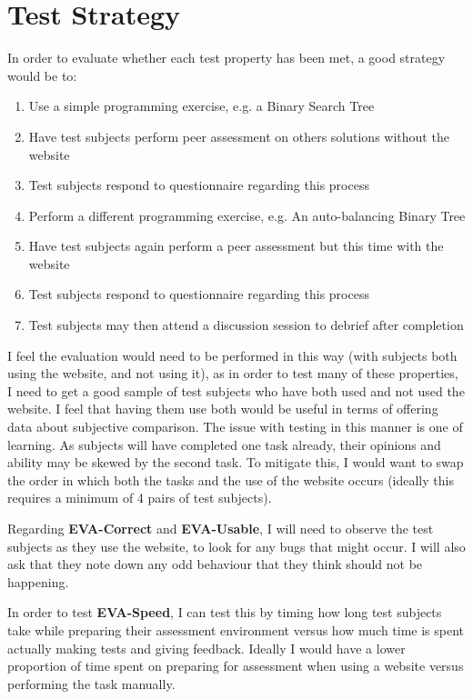 \documentclass[a4paper,11pt]{report}
\begin{document}
\section{Test Strategy}
In order to evaluate whether each test property has been met, a good strategy would be to:
\begin{enumerate}
 \item Use a simple programming exercise, e.g. a Binary Search Tree
 \item Have test subjects perform peer assessment on others solutions without the website
 \item Test subjects respond to questionnaire regarding this process
 \item Perform a different programming exercise, e.g. An auto-balancing Binary Tree
 \item Have test subjects again perform a peer assessment but this time with the website
 \item Test subjects respond to questionnaire regarding this process
 \item Test subjects may then attend a discussion session to debrief after completion
\end{enumerate}
I feel the evaluation would need to be performed in this way (with subjects both using the website, and not using it), as in order to test many of these properties, I need to get a good sample of test subjects who have both used and not used the website. I feel that having them use both would be useful in terms of offering data about subjective comparison. The issue with testing in this manner is one of learning. As subjects will have completed one task already, their opinions and ability may be skewed by the second task. To mitigate this, I would want to swap the order in which both the tasks and the use of the website occurs (ideally this requires a minimum of 4 pairs of test subjects).\par
Regarding \textbf{EVA-Correct} and \textbf{EVA-Usable}, I will need to observe the test subjects as they use the website, to look for any bugs that might occur. I will also ask that they note down any odd behaviour that they think should not be happening.\par
In order to test \textbf{EVA-Speed}, I can test this by timing how long test subjects take while preparing their assessment environment versus how much time is spent actually making tests and giving feedback. Ideally I would have a lower proportion of time spent on preparing for assessment when using a website versus performing the task manually.\par
\end{document}
